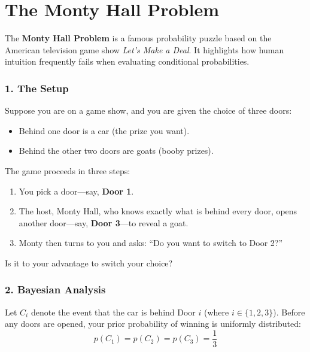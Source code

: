 \documentclass{article}
\begin{document}
\section*{The Monty Hall Problem}

The \textbf{Monty Hall Problem} is a famous probability puzzle based on the American television game show \textit{Let's Make a Deal}. It highlights how human intuition frequently fails when evaluating conditional probabilities.

\subsubsection*{1. The Setup}
Suppose you are on a game show, and you are given the choice of three doors:
\begin{itemize}
    \item Behind one door is a car (the prize you want).
    \item Behind the other two doors are goats (booby prizes).
\end{itemize}
The game proceeds in three steps:
\begin{enumerate}
    \item You pick a door—say, \textbf{Door 1}.
    \item The host, Monty Hall, who knows exactly what is behind every door, opens another door—say, \textbf{Door 3}—to reveal a goat.
    \item Monty then turns to you and asks: ``Do you want to switch to Door 2?''
\end{enumerate}
Is it to your advantage to switch your choice?

\subsubsection*{2. Bayesian Analysis}
Let $C_i$ denote the event that the car is behind Door $i$ (where $i \in \{1, 2, 3\}$). Before any doors are opened, your prior probability of winning is uniformly distributed:
\begin{equation}
    p(C_1) = p(C_2) = p(C_3) = \frac{1}{3}
\end{equation}
\end{document}
